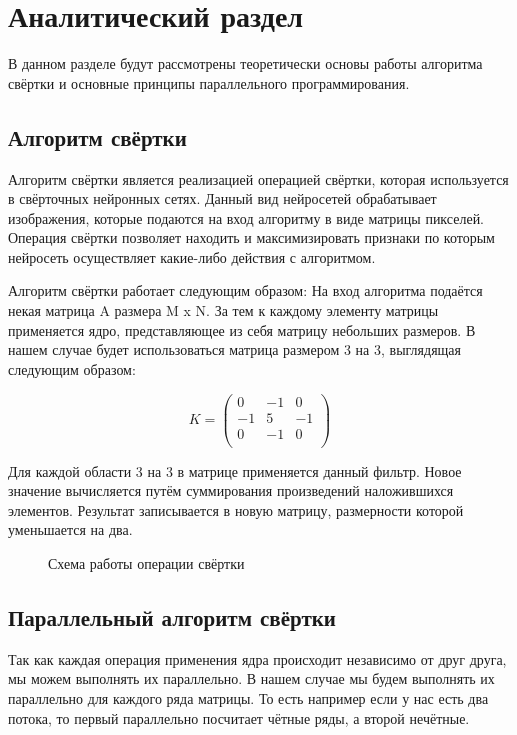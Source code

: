 \chapter{Аналитический раздел}
В данном разделе будут рассмотрены теоретически основы работы алгоритма свёртки и основные принципы параллельного программирования.

\section{Алгоритм свёртки}
Алгоритм свёртки является реализацией операцией свёртки, которая используется в свёрточных нейронных сетях. Данный вид нейросетей обрабатывает изображения, которые подаются на вход алгоритму в виде матрицы пикселей. Операция свёртки позволяет находить и максимизировать признаки по которым нейросеть осуществляет какие-либо действия с алгоритмом.

Алгоритм свёртки работает следующим образом:
На вход алгоритма подаётся некая матрица A размера M x N. За тем к каждому элементу матрицы применяется ядро, представляющее из себя матрицу небольших размеров. В нашем случае будет использоваться матрица размером 3 на 3, выглядящая следующим образом:

\begin{equation}
	K = \left(
	\begin{array}{ccc}
			0 & -1 & 0\\
			-1 & 5 & -1\\
			0 & -1 & 0\\
		\end{array}
	\right)
\end{equation}

Для каждой области 3 на 3 в матрице применяется данный фильтр. Новое значение вычисляется путём суммирования произведений наложившихся элементов. Результат записывается в новую матрицу, размерности которой уменьшается на два.

\begin{figure}[ph!]
	\caption{Схема работы операции свёртки}
\end{figure}

\newpage

\section{Параллельный алгоритм свёртки}
Так как каждая операция применения ядра происходит независимо от друг друга, мы можем выполнять их параллельно. В нашем случае мы будем выполнять их параллельно для каждого ряда матрицы. То есть например если у нас есть два потока, то первый параллельно посчитает чётные ряды, а второй нечётные.

